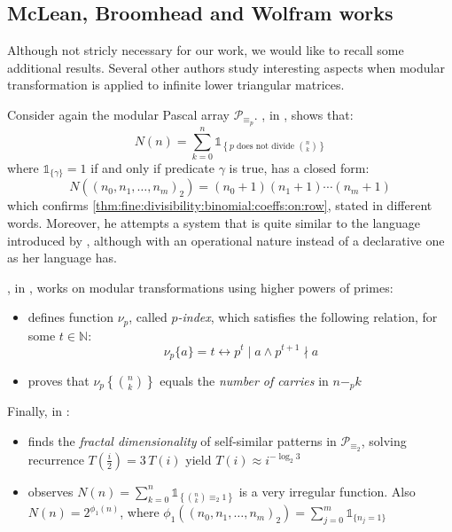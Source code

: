 \subsection{McLean, Broomhead and Wolfram works}
\label{subsection:modular:alter:works}
Although not stricly necessary for our work, we would like to recall some
additional results. Several other authors study interesting aspects when
modular transformation is applied to infinite lower triangular matrices.

Consider again the modular Pascal array $\mathcal{P}_{\equiv_{p}}$.
\citeauthor{broomhead:1972}, in \cite{broomhead:1972}, shows that:
\begin{displaymath}
    N(n)=\sum_{k=0}^{n}{\mathbb{1}_{\left\lbrace p\text{ does not divide }{{n}\choose{k}}\right\rbrace}}
\end{displaymath}
where $\mathbb{1}_{\lbrace \gamma \rbrace}=1$ if and only if predicate $\gamma$ is true,
has a closed form:
\begin{displaymath}
    N((n_{0},n_{1},\ldots,n_{m})_{2})=(n_{0}+1)(n_{1}+1)\cdots(n_{m}+1)
\end{displaymath}
which confirms \autoref{thm:fine:divisibility:binomial:coeffs:on:row}, stated in different words.
Moreover, he attempts a system that is quite similar to the language introduced by \citeauthor{sved:1988},
although with an operational nature instead of a declarative one as her language has.

\citeauthor{mclean:1974}, in \cite{mclean:1974}, works on modular transformations using
higher powers of primes:
\begin{itemize}
    \item defines function $\nu_{p}$, called \emph{$p$-index}, which satisfies the following relation,
        for some $t\in\mathbb{N}$: 
        \begin{displaymath}
            \nu_{p}\lbrace a\rbrace =t \leftrightarrow p^{t}\mid a \wedge p^{t+1}\nmid a
        \end{displaymath}
    \item proves that {$\nu_{p}\left\lbrace {{n}\choose{k}}\right\rbrace $} 
        equals the \emph{number of carries} in $n-_{p}k$
\end{itemize}

Finally, \citeauthor{wolfram:1984} in \cite{wolfram:1984}:
\begin{itemize}
    \item finds the \emph{fractal dimensionality} of self-similar patterns in $\mathcal{P}_{\equiv_{2}}$,
        solving recurrence $T\left(\frac{i}{2}\right)=3\,T(i)$ yield $T(i)\approx i^{-\log_{2}{3}}$
    \item observes $N(n)=\sum_{k=0}^{n}{\mathbb{1}_{\left\lbrace{{n}\choose{k}}\equiv_{2}1\right\rbrace}}$ 
        is a very irregular function. Also $N(n)=2^{\phi_{1}(n)}$, where $ \phi_{1}((n_{0},n_{1},\ldots,n_{m})_{2})=
            \sum_{j=0}^{m}{\mathbb{1}_{\lbrace n_{j}=1\rbrace} }$
\end{itemize}
